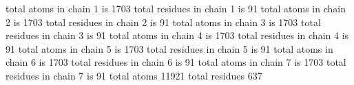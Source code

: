  total atoms in chain           1 is        1703
 total residues in chain           1 is          91
 total atoms in chain           2 is        1703
 total residues in chain           2 is          91
 total atoms in chain           3 is        1703
 total residues in chain           3 is          91
 total atoms in chain           4 is        1703
 total residues in chain           4 is          91
 total atoms in chain           5 is        1703
 total residues in chain           5 is          91
 total atoms in chain           6 is        1703
 total residues in chain           6 is          91
 total atoms in chain           7 is        1703
 total residues in chain           7 is          91
 total atoms       11921
 total residues         637
